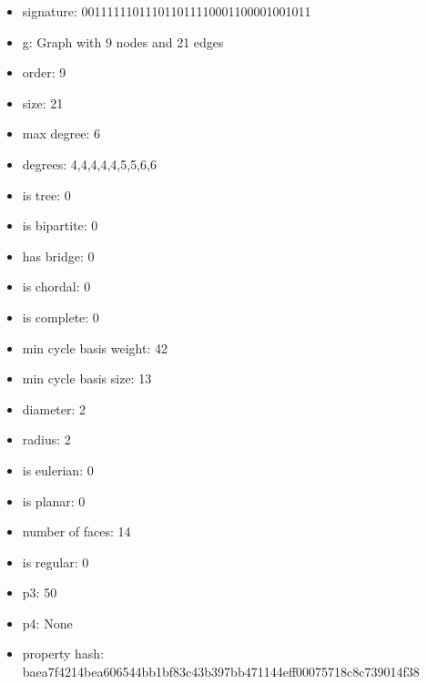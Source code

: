 \newpage
\begin{figure}
\end{figure}
\begin{itemize}
\item signature: 001111110111011011110001100001001011
\item g: Graph with 9 nodes and 21 edges
\item order: 9
\item size: 21
\item max degree: 6
\item degrees: 4,4,4,4,4,5,5,6,6
\item is tree: 0
\item is bipartite: 0
\item has bridge: 0
\item is chordal: 0
\item is complete: 0
\item min cycle basis weight: 42
\item min cycle basis size: 13
\item diameter: 2
\item radius: 2
\item is eulerian: 0
\item is planar: 0
\item number of faces: 14
\item is regular: 0
\item p3: 50
\item p4: None
\item property hash: baea7f4214bea606544bb1bf83c43b397bb471144eff00075718c8c739014f38
\end{itemize}
